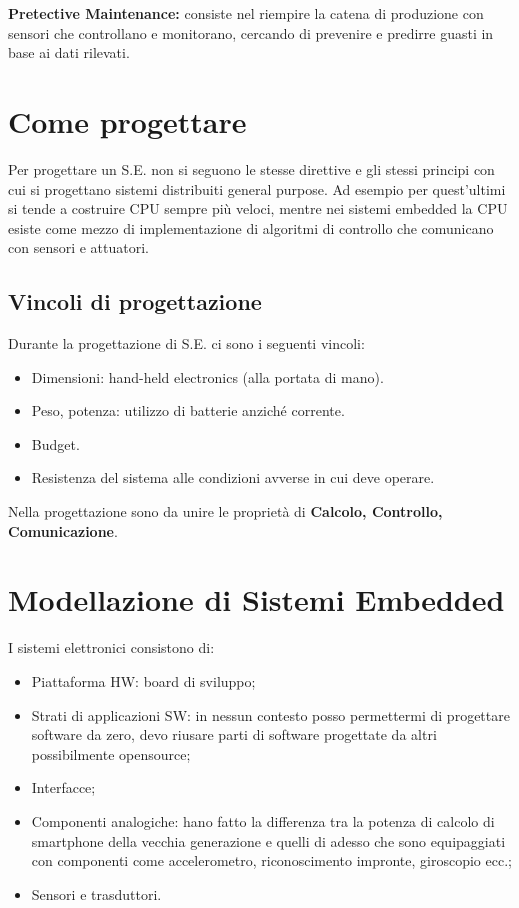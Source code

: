 \documentclass[a4paper]{article}
\theoremstyle{definition}
\begin{document}
		\noindent
		\textbf{Pretective Maintenance:} consiste nel riempire la catena di produzione con sensori che controllano e monitorano, cercando di prevenire e predirre guasti in base ai dati rilevati.
		
	\section{Come progettare}
		Per progettare un S.E. non si seguono le stesse direttive e gli stessi principi con cui si progettano sistemi distribuiti general purpose. Ad esempio per quest'ultimi si tende a costruire CPU sempre più veloci, mentre nei sistemi embedded la CPU esiste come mezzo di implementazione di algoritmi di controllo che comunicano con sensori e attuatori. 
		
	\subsection{Vincoli di progettazione}
		Durante la progettazione di S.E. ci sono i seguenti vincoli:
		\begin{itemize}
			\item Dimensioni: hand-held electronics (alla portata di mano).
			\item Peso, potenza: utilizzo di batterie anziché corrente. 
			\item Budget.
			\item Resistenza del sistema alle condizioni avverse in cui deve operare.
		\end{itemize}
		Nella progettazione sono da unire le proprietà di \textbf{Calcolo, Controllo, Comunicazione}.
		
	\section{Modellazione di Sistemi Embedded}
		I sistemi elettronici consistono di:
		\begin{itemize}
			\item Piattaforma HW: board di sviluppo;
			\item Strati di applicazioni SW: in nessun contesto posso permettermi di progettare software da zero, devo riusare parti di software progettate da altri possibilmente opensource;
			\item Interfacce;
			\item Componenti analogiche: hano fatto la differenza tra la potenza di calcolo di smartphone della vecchia generazione e quelli di adesso che sono equipaggiati con componenti come accelerometro, riconoscimento impronte, giroscopio ecc.;
			\item Sensori e trasduttori.
		\end{itemize}
		
\end{document}
